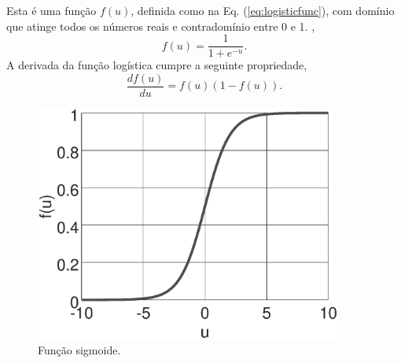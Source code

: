 

\begin{minipage}{0.5\textwidth}
\begin{definition}\label{def:logisticfunc}
Esta é uma função $f(u)$, definida como na Eq. (\ref{eq:logisticfunc}), 
com domínio que atinge todos os números reais e 
contradomínio entre 0 e 1. \cite[pp. 27]{kurkova2001artificial},
\begin{equation}\label{eq:logisticfunc}
f(u)=\frac{1}{1+e^{-u}}.
\end{equation}
A derivada da função logística cumpre a seguinte propriedade, 
\begin{equation}\label{eq:derlogisticfunc}
\frac{df(u)}{du}=f(u)(1-f(u)).
\end{equation}
\end{definition}
\end{minipage}
\begin{minipage}{0.5\textwidth}
     \begin{figure}[H]
         \centering
         \includegraphics[width=0.9\textwidth]{chapters/classificacao/mfiles/logisticfunc/sigmoid.eps}
         \caption{Função sigmoide. }
         \label{fig:logisticfunc}
     \end{figure}
\end{minipage}


